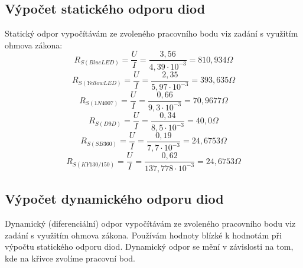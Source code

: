 \documentclass[12pt]{article} %
\begin{document}
\subsection{Výpočet statického odporu diod}
Statický odpor vypočítávám ze zvoleného pracovního bodu viz zadání s využitím ohmova zákona:
\begin{equation}
R_{S(BlueLED)}=\frac{U}{I}=\frac{3,56}{4,39\cdot 10^{-3}}=810,934\Omega
\end{equation}
\begin{equation}
R_{S(YellowLED)}=\frac{U}{I}=\frac{2,35}{5,97\cdot 10^{-3}}=393,635\Omega
\end{equation}
\begin{equation}
R_{S(1N4007)}=\frac{U}{I}=\frac{0,66}{9,3\cdot 10^{-3}}=70,9677\Omega
\end{equation}
\begin{equation}
R_{S(D9D)}=\frac{U}{I}=\frac{0,34}{8,5\cdot 10^{-3}}=40,0\Omega
\end{equation}
\begin{equation}
R_{S(SB 360)}=\frac{U}{I}=\frac{0,19}{7,7\cdot 10^{-3}}=24,6753\Omega
\end{equation}
\begin{equation}
R_{S(KY 130/150)}=\frac{U}{I}=\frac{0,62}{137,778\cdot 10^{-3}}=24,6753\Omega
\end{equation}

\subsection{Výpočet dynamického odporu diod}
Dynamický (diferenciální) odpor vypočítávám ze zvoleného pracovního bodu viz zadání s využitím ohmova zákona. Používám hodnoty blízké k hodnotám při výpočtu statického odporu diod. Dynamický odpor se mění v závislosti na tom, kde na křivce zvolíme pracovní bod.
\end{document}
